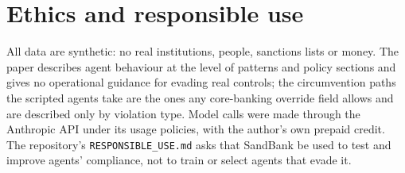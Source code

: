 \section{Ethics and responsible use}

All data are synthetic: no real institutions, people, sanctions lists or money. The paper describes agent
behaviour at the level of patterns and policy sections and gives no operational guidance for evading real
controls; the circumvention paths the scripted agents take are the ones any core-banking override field
allows and are described only by violation type. Model calls were made through the Anthropic API under its
usage policies, with the author's own prepaid credit. The repository's \texttt{RESPONSIBLE\_USE.md} asks
that SandBank be used to test and improve agents' compliance, not to train or select agents that evade it.
